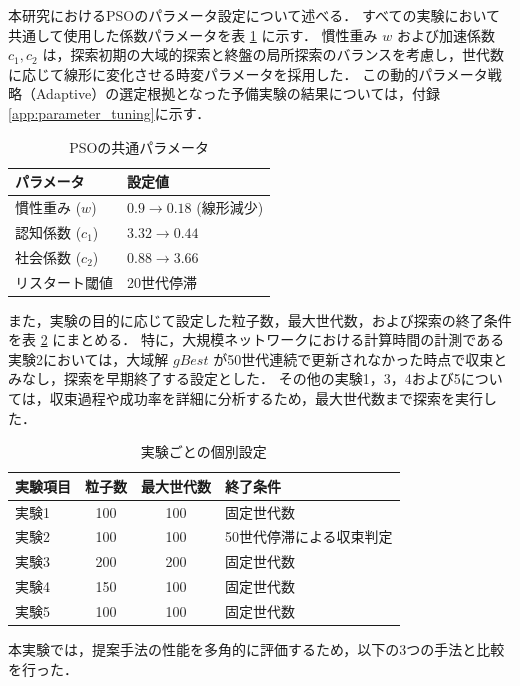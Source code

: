 本研究におけるPSOのパラメータ設定について述べる．
すべての実験において共通して使用した係数パラメータを表 \ref{tab:common_params} に示す．
慣性重み $w$ および加速係数 $c_1, c_2$ は，探索初期の大域的探索と終盤の局所探索のバランスを考慮し，世代数に応じて線形に変化させる時変パラメータを採用した．
この動的パラメータ戦略（Adaptive）の選定根拠となった予備実験の結果については，付録\ref{app:parameter_tuning}に示す．
\begin{table}[tb]
  \centering
  \caption{PSOの共通パラメータ}
  \label{tab:common_params}
  \begin{tabular}{l|l} \hline
    パラメータ & 設定値 \\ \hline
    慣性重み ($w$) & $0.9 \to 0.18$ (線形減少) \\
    認知係数 ($c_1$) & $3.32 \to 0.44$ \\
    社会係数 ($c_2$) & $0.88 \to 3.66$ \\
    リスタート閾値 & 20世代停滞 \\ \hline
  \end{tabular}
\end{table}

また，実験の目的に応じて設定した粒子数，最大世代数，および探索の終了条件を表 \ref{tab:exp_settings} にまとめる．
特に，大規模ネットワークにおける計算時間の計測である実験2においては，大域解 $gBest$ が50世代連続で更新されなかった時点で収束とみなし，探索を早期終了する設定とした．
その他の実験1，3，4および5については，収束過程や成功率を詳細に分析するため，最大世代数まで探索を実行した．

\begin{table}[tb]
  \centering
  \caption{実験ごとの個別設定}
  \label{tab:exp_settings}
  \begin{tabular}{l|c|c|l} \hline
    実験項目 & 粒子数 & 最大世代数 & 終了条件 \\ \hline
    実験1 & 100 & 100 & 固定世代数 \\
    実験2 & 100 & 100 & 50世代停滞による収束判定 \\
    実験3 & 200 & 200 & 固定世代数 \\
    実験4 & 150 & 100 & 固定世代数 \\
    実験5 & 100 & 100 & 固定世代数 \\ \hline
  \end{tabular}
\end{table}

本実験では，提案手法の性能を多角的に評価するため，以下の3つの手法と比較を行った．


